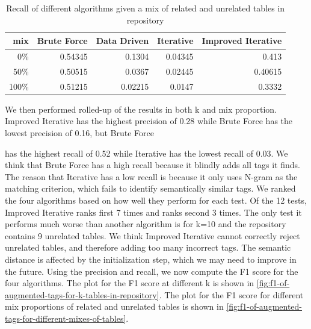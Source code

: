 \begin{table}[h!]
    \centering
    \scriptsize
    \begin{center}
      \caption{Recall of different algorithms given a mix of related and unrelated tables in repository}
      \label{tab:Recall-of-different-algorithms-given-a-mix-of-related-and-unrelated-tables-in-repository}
      \begin{tabular}{|r|r|r|r|r|}
        \hline
        \textbf{mix} & \textbf{Brute Force} & \textbf{Data Driven} & \textbf{Iterative} & \textbf{Improved Iterative} \\
        \hline
        0\% & 0.54345 & 0.1304 & 0.04345 & 0.413 \\
        \hline
        50\% & 0.50515 & 0.0367 & 0.02445 & 0.40615 \\
        \hline
        100\% & 0.51215 & 0.02215 & 0.0147 & 0.3332 \\
        \hline        
      \end{tabular}
    \end{center}
\end{table}

We then performed rolled-up of the results in both k and mix proportion. Improved Iterative has the highest precision of 0.28 while Brute Force has the lowest precision of 0.16, but Brute Force

has the highest recall of 0.52 while Iterative has the lowest recall of 0.03. We think that Brute Force has a high recall because it blindly adds all tags it finds. The reason that Iterative has a low recall is because it only uses N-gram as the matching criterion, which fails to identify semantically similar tags.
We ranked the four algorithms based on how well they perform for each test. Of the 12 tests, Improved Iterative ranks first 7 times and ranks second 3 times. The only test it performs much worse than another algorithm is for k=10 and the repository contains 9 unrelated tables. We think Improved Iterative cannot correctly reject unrelated tables, and therefore adding too many incorrect tags. The semantic distance is affected by the initialization step, which we may need to improve in the future.
Using the precision and recall, we now compute the F1 score for the four algorithms. The plot for the F1 score at different k is shown in \autoref{fig:f1-of-augmented-tags-for-k-tables-in-repository}. The plot for the F1 score for different mix proportions of related and unrelated tables is shown in \autoref{fig:f1-of-augmented-tags-for-different-mixes-of-tables}.

